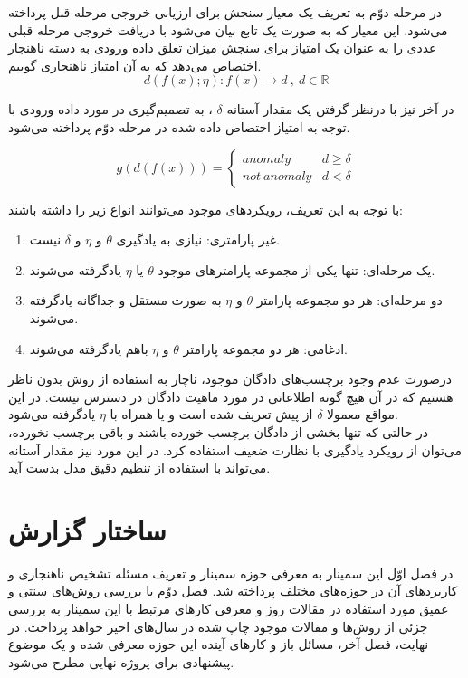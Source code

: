 \documentclass[12pt,a4paper]{report}
\begin{document}
در مرحله دوّم به تعریف یک معیار سنجش برای ارزیابی خروجی مرحله قبل پرداخته می‌شود. این معیار که به صورت یک تابع بیان می‌شود با دریافت خروجی مرحله قبلی عددی را به عنوان یک امتیاز برای سنجش میزان تعلق داده ورودی به دسته ناهنجار اختصاص می‌دهد که به آن امتیاز ناهنجاری گوییم.
\begin{equation}
d(f(x);\eta): f(x) \rightarrow d \  ,\  d \in \mathbb{R}
\end{equation}

در آخر نیز با درنظر گرفتن یک مقدار آستانه
 $\delta$
 ، به تصمیم‌گیری در مورد داده ورودی با توجه به امتیاز اختصاص داده شده در مرحله دوّم پرداخته می‌شود.

\begin{equation}
g(d(f(x))) = 
\left\{
	\begin{array}{ll}
		anomaly  & d \geq \delta \\
		not\ anomaly & d < \delta
	\end{array}
\right.
\end{equation}

با توجه به این تعریف، رویکرد‌های موجود می‌توانند انواع زیر را داشته باشند:
\begin{enumerate}
	\item {غیر پارامتری: نیازی به یادگیری $\theta$ و $\eta$ و $\delta$ نیست.}
	\item{یک مرحله‌ای: تنها یکی از مجموعه پارامترهای موجود $\theta$ یا  $\eta$ یاد‌گرفته می‌شوند.}
	\item{دو مرحله‌ای:‌ هر دو مجموعه پارامتر $\theta$ و $\eta$ به صورت مستقل و جداگانه یاد‌گرفته می‌شوند.}
	\item{ادغامی: هر دو مجموعه پارامتر $\theta$ و $\eta$ باهم یادگرفته می‌شوند. }
\end{enumerate}

درصورت عدم وجود برچسب‌های دادگان موجود، ناچار به استفاده از روش بدون ناظر هستیم که در آن هیچ گونه اطلاعاتی در مورد ماهیت دادگان در دسترس نیست. در  این مواقع معمولا $\delta$ از پیش تعریف شده است و یا همراه با  $\eta$ یادگرفته می‌شود.\\
در حالتی که تنها بخشی از دادگان برچسب خورده باشند و باقی برچسب نخورده، می‌توان از رویکرد یادگیری با نظارت ضعیف استفاده کرد. در این مورد نیز مقدار آستانه می‌تواند با استفاده از تنظیم دقیق مدل بدست آید.
\section{ساختار گزارش}
در فصل اوّل این سمینار به معرفی حوزه سمینار و تعریف مسئله تشخیص ناهنجاری و کاربرد‌های آن در حوزه‌های مختلف پرداخته شد. فصل دوّم  با بررسی روش‌های سنتی و عمیق مورد استفاده در مقالات روز و معرفی کار‌های مرتبط با این سمینار به بررسی جزئی از روش‌ها و مقالات موجود چاپ شده در سال‌های اخیر خواهد پرداخت. در نهایت، فصل آخر، مسائل باز و کار‌های آینده این حوزه معرفی شده و یک موضوع پیشنهادی برای پروژه نهایی مطرح می‌شود.
\end{document}
